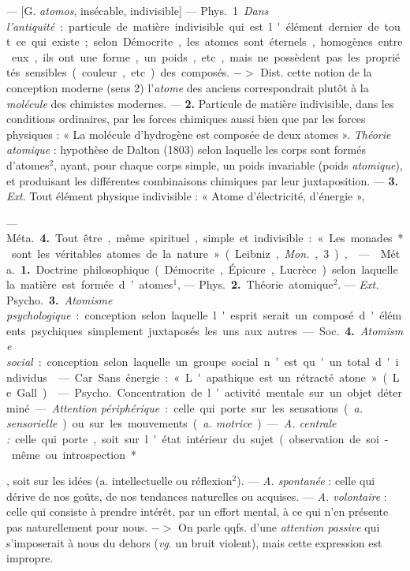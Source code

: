 \begin{itemize}[leftmargin=1cm, label=, itemsep=1pt]
{{{ — [G. {\it atomos}, insécable, indivisible] — \si{Phys.} 1 {\it Dans l'antiquité} :
particule de matière indivisible qui
est l'élément dernier de tout ce qui
existe; selon Démocrite, les atomes
sont éternels, homogènes entre eux,
ils ont une forme, un poids, etc.,
mais ne possèdent pas les propriétés
sensibles (couleur, etc.) des composés. $->$ Dist. cette notion de la
conception moderne (sens 2)
l'{\it atome} des anciens correspondrait
plutôt à la {\it molécule} des chimistes
modernes. — {\bf 2.} Particule de matière
indivisible, dans les conditions ordinaires, par les forces chimiques
aussi bien que par les forces physiques : « La molécule d'hydrogène
est composée de deux atomes ».
{\it Théorie atomique} : hypothèse de
Dalton (1803) selon laquelle les
corps sont formés d’atomes$^2$, ayant,
pour chaque corps simple, un poids
invariable (poids {\it atomique}), et produisant les différentes combinaisons
chimiques par leur juxtaposition. —
 {\bf 3.} {\it Ext}. Tout élément physique indivisible : « Atome d'électricité,
d'énergie »,

— \si{Méta.} {\bf 4.} Tout être, même spirituel, simple et indivisible : « Les
monades* sont les véritables atomes
de la nature » (Leibniz, {\it Mon.}, 3),

 —  \si{Méta.} {\bf 1.} Doctrine philosophique (Démocrite, Épicure,
Lucrèce) selon laquelle la matière est
formée d’atomes$^1$, — \si{Phys.} {\bf 2.} Théorie
atomique$^2$. — {\it Ext.} \si{Psycho.} {\bf 3.} {\it Atomisme psychologique} : conception
selon laquelle l'esprit serait un
composé d'éléments psychiques
simplement juxtaposés les uns aux
autres. — \si{Soc.} {\bf 4.} {\it Atomisme social} :
conception selon laquelle un groupe
social n’est qu'un total d'individus.

 — Car. Sans énergie : « L'apathique est un rétracté atone »
(Le Gall).

 — \si{Psycho.} Concentration
de l’activité mentale sur un objet
déterminé. — {\it Attention périphérique} : celle qui porte sur les sensations
({\it a. sensorielle}) ou sur les mouvements ({\it a. motrice}). — {\it A. centrale :}
celle qui porte, soit sur l'état intérieur du sujet (observation de
soi-même ou introspection*}, soit sur les
idées (a. intellectuelle ou réflexion$^2$).
— {\it A. spontanée} : celle qui dérive de
nos goûts, de nos tendances naturelles ou acquises. — {\it A. volontaire} :
celle qui consiste à prendre intérêt,
par un effort mental, à ce qui n’en
présente pas naturellement pour
nous. $->$ On parle qqfs. d’une
{\it attention passive} qui s'imposerait à
nous du dehors ({\it vg}. un bruit violent),
mais cette expression est impropre.

}}
\end{itemize}
